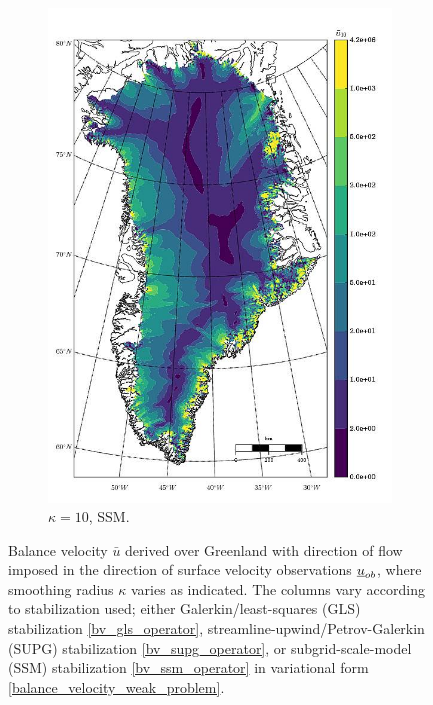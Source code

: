 \begin{figure}
\begin{subfigure}[b]{0.25\linewidth}
    \includegraphics[width=\linewidth]{images/balance_velocity/greenland/d_U_ob/Ubar_5H_kappa_10_SSM.jpg}
  \caption{$\kappa = 10$, SSM.}
  \label{greenland_bv_image_d_U_ob_kappa_10_SSM}
  \end{subfigure}
 
  \caption[Greenland balance-velocity with $\mathbf{d}^{\text{data}} = \mathbf{u}_{ob}$.]{Balance velocity $\bar{u}$ derived over Greenland with direction of flow imposed in the direction of surface velocity observations $\underline{u}_{ob}$, where smoothing radius $\kappa$ varies as indicated.  The columns vary according to stabilization used; either Galerkin/least-squares (GLS) stabilization \cref{bv_gls_operator}, streamline-upwind/Petrov-Galerkin (SUPG) stabilization \cref{bv_supg_operator}, or subgrid-scale-model (SSM) stabilization \cref{bv_ssm_operator} in variational form \cref{balance_velocity_weak_problem}. \newline}

  \label{greenland_bv_image_d_U_ob}

\end{figure}

